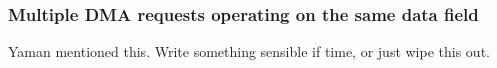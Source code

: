 \subsubsection{Multiple DMA requests operating on the same data field}
Yaman mentioned this. Write something sensible if time, or just wipe this out.

% 



%

%
%

